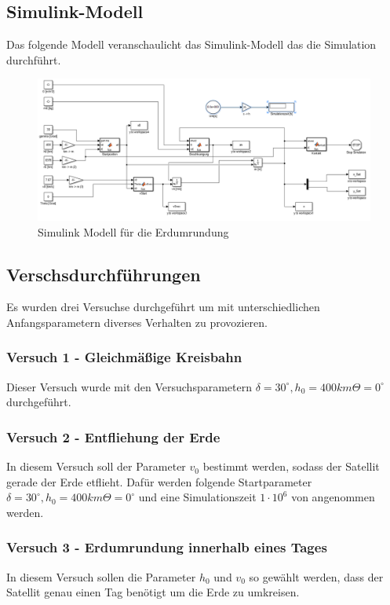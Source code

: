 \documentclass[]{scrartcl}
\begin{document}
\subsection{Simulink-Modell}

Das folgende Modell veranschaulicht das Simulink-Modell das die Simulation durchführt.

\begin{figure}[H]
\centering
\includegraphics[width=1\linewidth]{./Weltraum_1}
\caption{Simulink Modell für die Erdumrundung}
\label{fig:1_BezeichnerDiagramm}
\end{figure}

\subsection{Verschsdurchführungen}
Es wurden drei Versuchse durchgeführt um mit unterschiedlichen Anfangsparametern diverses Verhalten zu provozieren.

\subsubsection{Versuch 1 - Gleichmäßige Kreisbahn}

Dieser Versuch wurde mit den Versuchsparametern $\delta = 30^\circ, h_0 = 400km \Theta = 0^\circ $ durchgeführt.


\subsubsection{Versuch 2 - Entfliehung der Erde}
In diesem Versuch soll der Parameter $v_0$ bestimmt werden, sodass der Satellit gerade der Erde etflieht. Dafür werden folgende Startparameter 
 $\delta = 30^\circ, h_0 = 400km \Theta = 0^\circ $ und eine Simulationszeit $1 \cdot 10^6$ von angenommen werden.


\subsubsection{Versuch 3 - Erdumrundung innerhalb eines Tages}
In diesem Versuch sollen die Parameter $h_0$ und $v_0$ so gewählt werden, dass der Satellit genau einen Tag benötigt um die Erde zu umkreisen.
\end{document}
